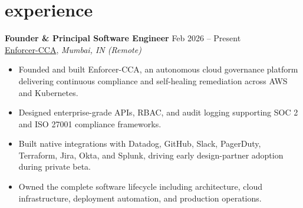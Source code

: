 \section{experience}\label{sec:experience}%
\begin{center}    
    \begin{raggedright}
        \normalsize
        \textbf{Founder \& Principal Software Engineer}
        \hfill {Feb 2026 -- Present} \\
        \small{\href{https://www.enforcer-cca.com/}{Enforcer-CCA}}, \textit{Mumbai, IN (Remote)}\\
        \normalsize
        \vspace{-8pt}
        \begin{itemize}
            \itemsep-3pt
            \item Founded and built Enforcer-CCA, an autonomous cloud governance platform delivering continuous compliance and self-healing remediation across AWS and Kubernetes.
            \item Designed enterprise-grade APIs, RBAC, and audit logging supporting SOC 2 and ISO 27001 compliance frameworks.
            \item Built native integrations with Datadog, GitHub, Slack, PagerDuty, Terraform, Jira, Okta, and Splunk, driving early design-partner adoption during private beta.
            \item Owned the complete software lifecycle including architecture, cloud infrastructure, deployment automation, and production operations.
        \end{itemize}
        \vspace{-8pt}
    \end{raggedright}
    

\end{center}
